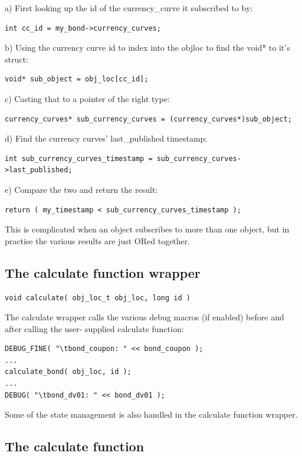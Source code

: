 \documentclass{report}
\begin{document}
a) First looking up the id of the currency_curve it subscribed to by:
\begin{verbatim}
int cc_id = my_bond->currency_curves;
\end{verbatim}

b) Using the currency curve id to index into the objloc to find the void* to it's struct:
\begin{verbatim}
void* sub_object = obj_loc[cc_id];
\end{verbatim}

c) Casting that to a pointer of the right type:
\begin{verbatim}
currency_curves* sub_currency_curves = (currency_curves*)sub_object;
\end{verbatim}

d) Find the currency curves' last_published timestamp:
    
\begin{verbatim}
int sub_currency_curves_timestamp = sub_currency_curves->last_published;
\end{verbatim}

e) Compare the two and return the result:
\begin{verbatim}
return ( my_timestamp < sub_currency_curves_timestamp );
\end{verbatim}

This is complicated when an object subscribes to more than one object, but in practise the various results are just ORed together. 

\subsection{The calculate function wrapper}

\begin{verbatim}
void calculate( obj_loc_t obj_loc, long id )
\end{verbatim}

The calculate wrapper calls the various debug macros (if enabled) before and after calling the user-
supplied calculate function:

\begin{verbatim}
DEBUG_FINE( "\tbond_coupon: " << bond_coupon );
...
calculate_bond( obj_loc, id );
...
DEBUG( "\tbond_dv01: " << bond_dv01 );
\end{verbatim}

Some of the state management is also handled in the calculate function wrapper.

\subsection{The calculate function}
\end{document}
